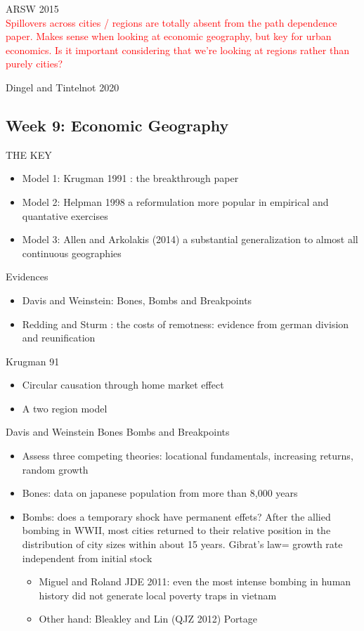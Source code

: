\documentclass[10pt, final]{article}
\begin{document}
ARSW 2015
\\
\textcolor{red}{Spillovers across cities / regions are totally absent from the path dependence paper. Makes sense when looking at economic geography, but key for urban economics. Is it important considering that we're looking at regions rather than purely cities?}

Dingel and Tintelnot 2020



\subsection{Week 9: Economic Geography} %
\label{sub:week_9_economic_geography}
THE KEY

\begin{itemize}
    \item Model 1: Krugman 1991 : the breakthrough paper
    \item Model 2: Helpman 1998 a reformulation more popular in empirical and quantative exercises
    \item Model 3: Allen and Arkolakis (2014) a substantial generalization to almost all continuous geographies
\end{itemize}
Evidences
\begin{itemize}
    \item Davis and Weinstein: Bones, Bombs and Breakpoints
    \item Redding and Sturm : the costs of remotness: evidence from german division and reunification
\end{itemize}


Krugman 91
\begin{itemize}
    \item Circular causation through home market effect
    \item A two region model
\end{itemize}

Davis and Weinstein Bones Bombs and Breakpoints
\begin{itemize}
    \item Assess three competing theories: locational fundamentals, increasing returns, random growth
    \item Bones: data on japanese population from more than 8,000 years
    \item Bombs: does a temporary shock have permanent effets? After the allied bombing in WWII, most cities returned to their relative position in the distribution of city sizes within about 15 years. Gibrat's law= growth rate independent from initial stock
    \begin{itemize}
        \item Miguel and Roland JDE 2011: even the most intense bombing in human history did not generate local poverty traps in vietnam
        \item Other hand: Bleakley and Lin (QJZ 2012) Portage
    \end{itemize}
\end{itemize}
\end{document}
